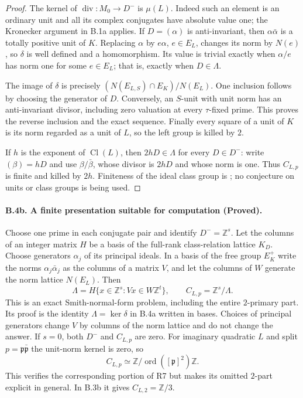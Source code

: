 \begin{proof}
The kernel of $\operatorname{div}:M_0\to D^-$ is $\mu(L)$.
Indeed such an element is an ordinary unit and all its complex
conjugates have absolute value one; the Kronecker argument in B.1a
applies. If $D=(\alpha)$ is anti-invariant, then
$\alpha\bar\alpha$ is a totally positive unit of $K$. Replacing
$\alpha$ by $e\alpha$, $e\in E_L$, changes its norm by $N(e)$, so
$\delta$ is well defined and a homomorphism. Its value is trivial
exactly when $\alpha/e$ has norm one for some $e\in E_L$; that is,
exactly when $D\in\Lambda$.

The image of $\delta$ is precisely
$(N(E_{L,S})\cap E_K)/N(E_L)$. One inclusion follows by choosing the
generator of $D$. Conversely, an $S$-unit with unit norm has an
anti-invariant divisor, including zero valuation at every
$\tau$-fixed prime. This proves the reverse inclusion and the exact
sequence. Finally every square of a unit of $K$ is its norm regarded
as a unit of $L$, so the left group is killed by $2$.

If $h$ is the exponent of $\operatorname{Cl}(L)$, then $2hD\in
\Lambda$ for every $D\in D^-$: write $(\beta)=hD$ and use
$\beta/\bar\beta$, whose divisor is $2hD$ and whose norm is one.
Thus $C_{L,p}$ is finite and killed by $2h$.
Finiteness of the ideal class group is
\citet[Theorems~4.3--4.4]{MilneANT2020}; no conjecture on units or
class groups is being used.
\end{proof}

\paragraph{B.4b. A finite presentation suitable for computation (Proved).}
\label{B4b}
Choose one prime in each conjugate pair and identify $D^-=\mathbb Z^s$.
Let the columns of an integer matrix $H$ be a basis of the full-rank
class-relation lattice $K_D$. Choose generators $\alpha_j$ of its
principal ideals. In a basis of the free group $E_K^+$ write the norms
$\alpha_j\bar\alpha_j$ as the columns of a matrix $V$, and let the
columns of $W$ generate the norm lattice $N(E_L)$. Then
\[
 \Lambda=H\{x\in\mathbb Z^s: Vx\in W\mathbb Z^t\},\qquad
 C_{L,p}=\mathbb Z^s/\Lambda.
\]
This is an exact Smith-normal-form problem, including the entire
$2$-primary part. Its proof is the identity $\Lambda=\ker\delta$ in
B.4a written in bases. Choices of principal generators change $V$
by columns of the norm lattice and do not change the answer. If
$s=0$, both $D^-$ and $C_{L,p}$ are zero. For imaginary quadratic $L$
and split $p=\mathfrak p\bar{\mathfrak p}$ the unit-norm kernel is
zero, so
\[
 C_{L,p}\simeq
 \mathbb Z/\operatorname{ord}([\mathfrak p]^2)\mathbb Z.
\]
This verifies the corresponding portion of R7 but makes its omitted
$2$-part explicit in general. In B.3b it gives $C_{L,2}=\mathbb Z/3$.

